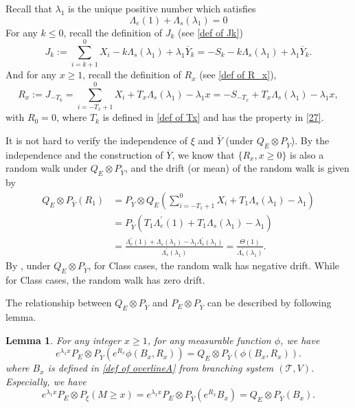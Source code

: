 \documentclass[]{article}
\numberwithin{equation}{section}
\theoremstyle{thmstyleone}%
\theoremstyle{thmstyletwo}%
\theoremstyle{thmstylethree}%
\theoremstyle{thmstylefour}%
\newtheorem{lemma}{Lemma}
\theoremstyle{thmstylefive}%
\theoremstyle{thmstylesix}%
\begin{document}
	Recall that $\lambda_1$ is the unique positive number which satisfies
	\begin{equation}
		\Lambda_e(1)+\Lambda_s(\lambda_1)=0
	\end{equation}
	For any $k\leqslant0$, recall the definition of $J_k$ (see \cref{def of Jk})
	\begin{equation}\label{def of Jk2}
		J_k := \sum_{i=k+1}^{0} X_i -k\Lambda_s(\lambda_1)+\lambda_1 \overline{Y}_{k}= -S_k-k\Lambda_s(\lambda_1)+\lambda_1 \overline{Y}_k.
	\end{equation}
	And for any $x\geqslant 1$, recall the definition of $R_x$ (see \cref{def of R_x}),
	\begin{equation}\label{def of R_x2}
		R_x :=J_{-T_k}= \sum_{i=-T_x+1}^{0} X_i +T_x\Lambda_s(\lambda_1)-\lambda_1 x
		=
		-S_{-T_x} +T_x\Lambda_s(\lambda_1)-\lambda_1 x,
	\end{equation}
	with $R_0 = 0$, where $T_k$ is defined in \cref{def of Tx} and has the property in \cref{27}. 
	
	It is not hard to verify the independence of $\xi$ and $\overline{Y}$ (under $Q_E\otimes P_{\overline{Y}}$). By the independence and the construction of $\overline{Y}$, we know that $\{R_x,x\geqslant0\}$ is also a random walk under $Q_E\otimes P_{\overline{Y}}$, and the drift (or mean) of the random walk is given by
	\begin{align}
		Q_E\otimes P_{\overline{Y}} \left( R_1\right)
		&=
		P_{\overline{Y}}\otimes Q_E\left( \sum_{i=-T_1+1}^{0} X_i +T_1\Lambda_s(\lambda_1)-\lambda_1 \right)
		\nonumber\\
		&=
		P_{\overline{Y}} \left( T_1\Lambda_e^\prime(1) +T_1\Lambda_s(\lambda_1)-\lambda_1 \right)
		\nonumber\\
		&= \frac{\Lambda_e^\prime(1) +\Lambda_s(\lambda_1)-\lambda_1\Lambda_s^\prime(\lambda_1)}{\Lambda_s^\prime(\lambda_1)} = \frac{\varTheta(1)}{\Lambda_s^\prime(\lambda_1)}.\label{mean of R}
	\end{align}
	By , under $Q_E\otimes P_{\overline{Y}}$, for Class  cases, the random walk has negative drift. While for Class  cases, the random walk has zero drift.
	
	The relationship between $Q_E\otimes P_{\overline{Y}}$ and $P_E\otimes P_{\overline{Y}}$ can be described by following lemma.
	\begin{lemma}\label{Measure change Relationship 1}
		For any integer $x\geqslant 1$, for any measurable function $\phi$, we have
		\begin{equation}
			e^{\lambda_1 x}P_E\otimes P_{\overline{Y}} (e^{R_x}\phi(B_x,R_x)) = Q_E\otimes P_{\overline{Y}} ( \phi(B_x,R_x) ).
		\end{equation}
		where $B_x$ is defined in \cref{def of overlineA} from branching system $(\mathcal{T},V)$.
		Especially, we have
		\begin{equation}
			e^{\lambda_1 x} P_E\otimes P_\xi(M\geqslant x)
			=
			e^{\lambda_1 x} P_E\otimes P_{\overline{Y}}(e^{R_x}B_x)
			=
			Q_E\otimes P_{\overline{Y}} (B_x).
		\end{equation}
	\end{lemma}
	
\end{document}
